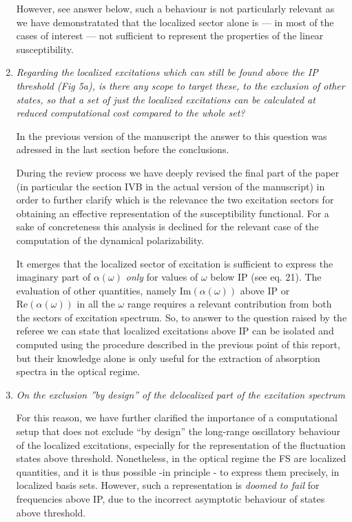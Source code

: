 \documentclass[11pt,a4paper]{article}
\begin{document}
\begin{enumerate}
However, see answer below, such a behaviour is not particularly relevant as we have demonstratated that the
localized sector alone is --- in most of the cases of interest --- not sufficient to represent the properties of the linear susceptibility.

\item \emph{Regarding the localized excitations which can still be found above the IP threshold (Fig 5a), is there any scope to target these, to the
exclusion of other states, so that a set of just the localized excitations can be calculated at reduced computational cost compared to the whole set?}

In the previous version of the manuscript the answer to this question was adressed in the last section before the conclusions.

 During the review process we have deeply revised the final part of the paper (in particular the section IVB in the actual version of the manuscript) in order to further  clarify which is the relevance the two excitation sectors for obtaining an effective representation of the susceptibility functional.
 For a sake of concreteness this analysis is declined for the relevant case of the computation of the dynamical polarizability.

 It emerges that the localized
 sector of excitation is sufficient to express the imaginary part of $\alpha(\omega)$ \emph{only} for values of $\omega$ below IP (see eq. 21). The evaluation of
 other quantities, namely $\mathrm{Im}(\alpha(\omega))$ above IP or $\mathrm{Re}(\alpha(\omega))$ in all the $\omega$ range requires a relevant contribution from
 both the sectors of excitation spectrum. So, to answer to the question raised by the referee we can state that localized excitations above IP can be isolated and computed using the procedure described in the previous point of this report, but their knowledge alone is only useful for the extraction of absorption spectra in the optical regime.

 \item \emph{On the exclusion ''by design'' of the delocalized part of the excitation spectrum}

 For this reason, we have further clarified the
 importance of a computational setup that does not exclude ``by design'' the long-range oscillatory behaviour of the localized excitations, especially for the representation
 of the fluctuation states above threshold.
 Nonetheless, in the optical regime the FS are localized quantities, and it is thus possible -in principle - to express them precisely, in localized basis sets. However, such a representation is \emph{doomed to fail} for frequencies above IP, due to the incorrect asymptotic behaviour of states above threshold.



\end{enumerate}
\end{document}
